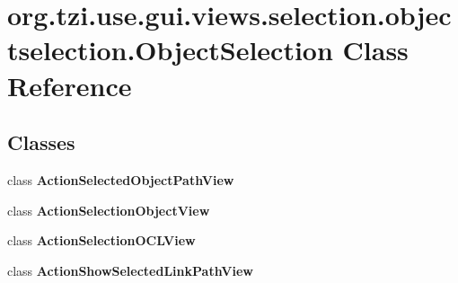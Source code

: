 \hypertarget{classorg_1_1tzi_1_1use_1_1gui_1_1views_1_1selection_1_1objectselection_1_1_object_selection}{\section{org.\-tzi.\-use.\-gui.\-views.\-selection.\-objectselection.\-Object\-Selection Class Reference}
\label{classorg_1_1tzi_1_1use_1_1gui_1_1views_1_1selection_1_1objectselection_1_1_object_selection}
}
\subsection*{Classes}
\begin{DoxyCompactItemize}
\item 
class {\bfseries Action\-Selected\-Object\-Path\-View}
\item 
class {\bfseries Action\-Selection\-Object\-View}
\item 
class {\bfseries Action\-Selection\-O\-C\-L\-View}
\item 
class {\bfseries Action\-Show\-Selected\-Link\-Path\-View}
\end{DoxyCompactItemize}
